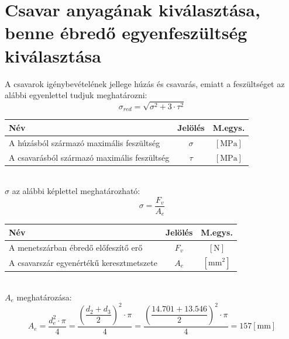 \documentclass[10pt, a4paper]{article}
\newcommand{\n}{\mathrm{\left[N\right]}}
\newcommand{\mpa}{\mathrm{\left[MPa\right]}}
\newcommand{\mm}{\mathrm{\left[mm\right]}}
\newcommand{\mmn}{\mathrm{\left[mm^2\right]}}
\begin{document}
	\section{Csavar anyagának kiválasztása, benne ébredő egyenfeszültség kiválasztása}
	A csavarok igénybevételének jellege húzás és csavarás, emiatt a feszültséget az alábbi egyenlettel tudjuk meghatározni:
	\begin{equation}
		\sigma_{red} = \sqrt{\sigma^2 + 3 \cdot \tau^2} \tag{6}
	\end{equation}
		\vspace{-20pt}
			\renewcommand{\arraystretch}{1.4}
								\begin{table}[!h]
									\centering
									\begin{tabular}{l|c|c}
										\textbf{Név}                              & \textbf{Jelölés} & \textbf{M.egys.} \\ \hline
										A húzásból származó maximális feszültség                     & $\sigma$                & $\mpa$          \\
										A csavarásból származó maximális feszültség          & $\tau$                & $\mpa$			 	 	       
									\end{tabular}
								\end{table}
			\renewcommand{\arraystretch}{1}\\
	$\sigma$ az alábbi képlettel meghatározható:
	\begin{equation}
		\sigma = \dfrac{F_v}{A_e} \tag{6.1}
	\end{equation}
			\vspace{-20pt}
				\renewcommand{\arraystretch}{1.4}
									\begin{table}[!h]
										\centering
										\begin{tabular}{l|c|c}
											\textbf{Név}                              & \textbf{Jelölés} & \textbf{M.egys.} \\ \hline
											A menetszárban ébredő előfeszítő erő                      & $F_v$                & $\n$          \\
											A csavarszár egyenértékű keresztmetszete          & $A_e$                & $\mmn$			 	 	       
										\end{tabular}
									\end{table}
				\renewcommand{\arraystretch}{1}\\
	$A_e$ meghatározása:
	\begin{equation}
		A_e = \dfrac{d_e^2 \cdot \pi}{4} = \dfrac{\left(\dfrac{d_2 + d_3}{2}\right)^2 \cdot \pi}{4} = \dfrac{\left(\dfrac{14.701 + 13.546}{2}\right)^2 \cdot \pi}{4} = 157 \mm\tag{6.1.1}
	\end{equation}
\end{document}
